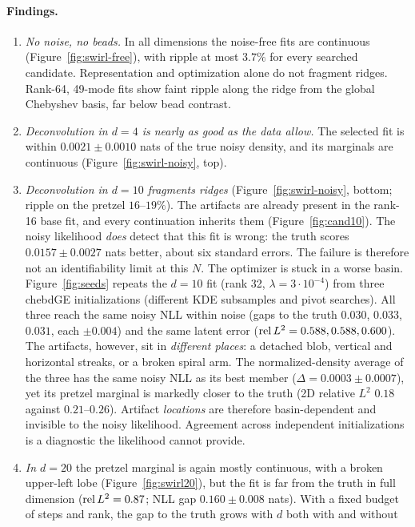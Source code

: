 \paragraph{Findings.}
\begin{enumerate}[leftmargin=2em,itemsep=2pt]
\item \emph{No noise, no beads.} In all dimensions the noise-free fits are continuous (Figure~\ref{fig:swirl-free}), with
ripple at most $3.7\%$ for every searched candidate. Representation and optimization alone do not fragment
ridges. Rank-64, 49-mode fits show faint ripple along the ridge from the global Chebyshev basis, far below bead
contrast.
\item \emph{Deconvolution in $d=4$ is nearly as good as the data allow.} The selected fit is within
$0.0021\pm0.0010$ nats of the true noisy density, and its marginals are continuous
(Figure~\ref{fig:swirl-noisy}, top).
\item \emph{Deconvolution in $d=10$ fragments ridges} (Figure~\ref{fig:swirl-noisy}, bottom; ripple on the pretzel
$16$--$19\%$). The artifacts are already present in the rank-16 base fit, and every continuation inherits them
(Figure~\ref{fig:cand10}). The noisy likelihood \emph{does} detect that this fit is wrong: the truth scores
$0.0157\pm0.0027$ nats better, about six standard errors. The failure is therefore not an identifiability limit
at this $N$. The optimizer is stuck in a worse basin. Figure~\ref{fig:seeds} repeats the $d=10$ fit (rank 32, $\lambda=3\cdot10^{-4}$) from three chebdGE initializations
(different KDE subsamples and pivot searches). All three reach the same noisy NLL within noise (gaps to the truth
$0.030$, $0.033$, $0.031$, each $\pm0.004$) and the same latent error ($\operatorname{rel}L^2=0.588,0.588,0.600$). The artifacts, however,
sit in \emph{different places}: a detached blob, vertical and horizontal streaks, or a broken spiral arm. The
normalized-density average of the three has the same noisy NLL as its best member ($\Delta=0.0003\pm0.0007$), yet
its pretzel marginal is markedly closer to the truth (2D relative $L^2$ $0.18$ against $0.21$--$0.26$). Artifact
\emph{locations} are therefore basin-dependent and invisible to the noisy likelihood. Agreement across independent
initializations is a diagnostic the likelihood cannot provide.
\item \emph{In $d=20$} the pretzel marginal is again mostly continuous, with a broken upper-left lobe
(Figure~\ref{fig:swirl20}), but the fit is far from the truth in full dimension ($\operatorname{rel}L^2=0.87$; NLL gap
$0.160\pm0.008$ nats). With a fixed budget of steps and rank, the gap to the truth grows with $d$ both with and without

\end{enumerate}
